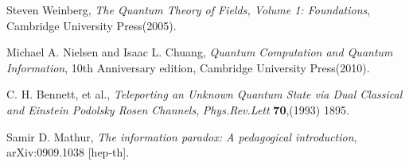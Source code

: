 \documentclass[12pt,a4paper]{article}
\begin{document}
\begin{thebibliography}{99}
Steven Weinberg, \emph{The Quantum Theory of Fields, Volume 1:
Foundations}, Cambridge University Press(2005).

Michael A. Nielsen and Isaac L. Chuang, \emph{Quantum Computation
and Quantum Information}, 10th Anniversary edition, Cambridge
University Press(2010).

C. H. Bennett, et al., \emph{Teleporting an Unknown Quantum State via Dual Classical and Einstein Podolsky Rosen Channels}, \emph{Phys.Rev.Lett} {\bf 70},(1993) 1895.

Samir D. Mathur, \emph{The information paradox: A pedagogical
introduction}, arXiv:0909.1038 [hep-th].


\end{thebibliography}
\end{document}
